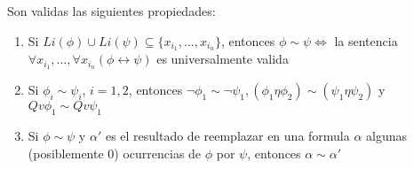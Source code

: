 \begin{lemma}
  Son validas las siguientes propiedades:
  \begin{enumerate}
    \item Si $Li(\phi) \cup Li(\psi) \subseteq \{x_{i_1}, \dots, x_{i_n}\}$, entonces $\phi \sim \psi \iff$ la sentencia $\forall x_{i_1},\dots,\forall x_{i_n}(\phi \leftrightarrow \psi)$ es universalmente valida
    \item Si $\phi_i \sim \psi_i$, $i = 1, 2$, entonces $\neg\phi_1 \sim \neg\psi_1, (\phi_1\eta\phi_2)\sim(\psi_1\eta\psi_2)$ y $Qv\phi_1\sim Qv\psi_1$
    \item Si $\phi\sim\psi$ y $\alpha'$ es el resultado de reemplazar en una formula $\alpha$ algunas (posiblemente 0) ocurrencias de $\phi$ por $\psi$, entonces $\alpha \sim \alpha'$ 
  \end{enumerate}
\end{lemma}
